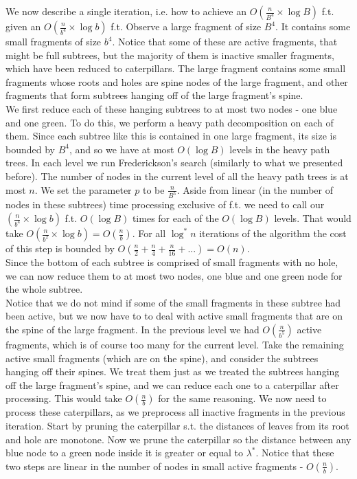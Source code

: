 \documentclass[11pt,a4paper]{article}
\theoremstyle{definition}
\theoremstyle{remark}
\begin{document}
We now describe a single iteration, i.e. how to achieve an $O(\frac{n}{B^4} \times \log B)$ f.t. given an $O(\frac{n}{b^4} \times \log b)$ f.t.
Observe a large fragment of size $B^4$. It contains some small fragments of size $b^4$. Notice that some of these are active fragments, that might be full subtrees, but the majority of them is inactive smaller fragments, which have been reduced to caterpillars. The large fragment contains some small fragments whose roots and holes are spine nodes of the large fragment, and other fragments that form subtrees hanging off of the large fragment's spine.\\ %

We first reduce each of these hanging subtrees to at most two nodes - one blue and one green. To do this, we perform a heavy path decomposition on each of them. Since each subtree like this is contained in one large fragment, its size is bounded by $B^4$, and so we have at most $O(\log B)$ levels in the heavy path trees. In each level we run Frederickson's search (similarly to what we presented before). The number of nodes in the current level of all the heavy path trees is at most $n$. We set the parameter $p$ to be $\frac{n}{B^5}$. Aside from linear (in the number of nodes in these subtrees) time processing exclusive of f.t. we need to call our $(\frac{n}{b^4} \times \log b)$ f.t. $O(\log B)$ times for each of the $O(\log B)$ levels. That would take $O(\frac{n}{b^2} \times \log b) = O(\frac{n}{b})$. For all $\log ^*n$ iterations of the algorithm the cost of this step is bounded by $O(\frac{n}{2}+\frac{n}{4}+\frac{n}{16}+...) = O(n)$.\\
Since the bottom of each subtree is comprised of small fragments with no hole, we can now reduce them to at most two nodes, one blue and one green node for the whole subtree.\\

Notice that we do not mind if some of the small fragments in these subtree had been active, but we now have to to deal with active small fragments  that are on the spine of the large fragment. In the previous level we had $O(\frac{n}{b^5})$ active fragments, which is of course too many for the current level. Take the remaining active small fragments (which are on the spine), and consider the subtrees hanging off their spines. We treat them just as we treated the subtrees hanging off the large fragment's spine, and we can reduce each one to a caterpillar after processing. This would take $O(\frac{n}{b})$ for the same reasoning. We now need to process these caterpillars, as we preprocess all inactive fragments in the previous iteration. Start by pruning the caterpillar s.t. the distances of leaves from its root and hole are monotone. Now we prune the caterpillar so the distance between any blue node to a green node inside it is greater or equal to $\lambda^*$. Notice that these two steps are linear in the number of nodes in small active fragments - $O(\frac{n}{b})$.
\end{document}
